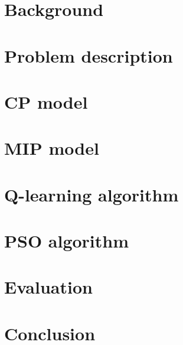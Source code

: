 \documentclass[3p,times]{elsarticle}
\begin{document}
\section{Background}


\section{Problem description}


\section{CP model}


\section{MIP model}


\section{Q-learning algorithm}


\section{PSO algorithm}


\section{Evaluation}


\section{Conclusion}




\end{document}
